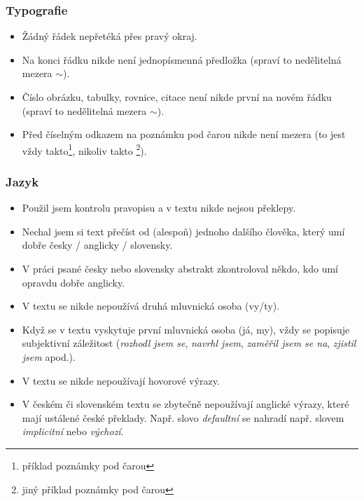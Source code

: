 \subsubsection*{Typografie}
\begin{itemize}
	\item Žádný řádek nepřetéká přes pravý okraj.
	\item Na konci řádku nikde není jednopísmenná předložka (spraví to nedělitelná mezera $\sim$).
	\item Číslo obrázku, tabulky, rovnice, citace není nikde první na novém řádku (spraví to nedělitelná mezera $\sim$).
	\item Před číselným odkazem na poznámku pod čarou nikde není mezera (to jest vždy takto\footnote{příklad poznámky pod čarou}, nikoliv takto \footnote{jiný příklad poznámky pod čarou}).
\end{itemize}

\subsubsection*{Jazyk}
\begin{itemize}
    \item Použil jsem kontrolu pravopisu a v textu nikde nejsou překlepy.
	\item Nechal jsem si text přečíst od (alespoň) jednoho dalšího člověka, který umí dobře česky / anglicky / slovensky.
	\item V práci psané česky nebo slovensky abstrakt zkontroloval někdo, kdo umí opravdu dobře anglicky.
	\item V textu se nikde nepoužívá druhá mluvnická osoba (vy/ty).
	\item Když se v textu vyskytuje první mluvnická osoba (já, my), vždy se popisuje subjektivní záležitost (\textit{rozhodl jsem se}, \textit{navrhl jsem}, \textit{zaměřil jsem se na}, \textit{zjistil jsem} apod.).
	\item V textu se nikde nepoužívají hovorové výrazy.
	\item V českém či slovenském textu se zbytečně nepoužívají anglické výrazy, které mají ustálené české překlady. Např. slovo \textit{defaultní} se nahradí např. slovem \textit{implicitní} nebo \textit{výchozí}.
\end{itemize}

